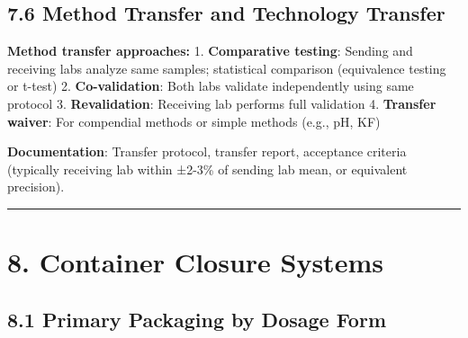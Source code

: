 \documentclass[
  11pt,
  a4paper,
]{report}
\begin{document}
\hypertarget{method-transfer-and-technology-transfer}{%
\subsection{7.6 Method Transfer and Technology
Transfer}\label{method-transfer-and-technology-transfer}}

\textbf{Method transfer approaches:} 1. \textbf{Comparative testing}:
Sending and receiving labs analyze same samples; statistical comparison
(equivalence testing or t-test) 2. \textbf{Co-validation}: Both labs
validate independently using same protocol 3. \textbf{Revalidation}:
Receiving lab performs full validation 4. \textbf{Transfer waiver}: For
compendial methods or simple methods (e.g., pH, KF)

\textbf{Documentation}: Transfer protocol, transfer report, acceptance
criteria (typically receiving lab within ±2-3\% of sending lab mean, or
equivalent precision).

\begin{center}\rule{0.5\linewidth}{0.5pt}\end{center}

\hypertarget{container-closure-systems}{%
\section{8. Container Closure Systems}\label{container-closure-systems}}

\hypertarget{primary-packaging-by-dosage-form}{%
\subsection{8.1 Primary Packaging by Dosage
Form}\label{primary-packaging-by-dosage-form}}
\end{document}
